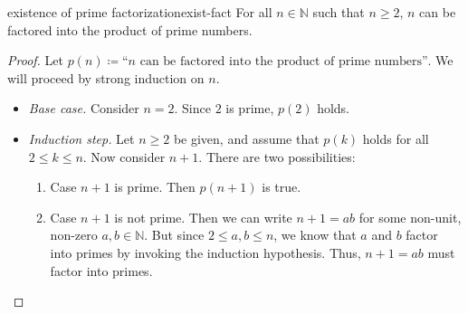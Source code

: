 \documentclass{article}
\theoremstyle{definition}
\begin{document}
\begin{theorem}{existence of prime factorization}{exist-fact}
  For all $n \in \mathbb{N}$ such that $n \ge 2$, $n$ can be factored into the
  product of prime numbers.
\end{theorem}
\begin{proof}
  Let $p(n) \coloneqq \textrm{``$n$ can be factored into the product of prime
  numbers''}$. We will proceed by strong induction on $n$.
  \begin{itemize}
    \item \textit{Base case.} Consider $n=2$. Since $2$ is prime, $p(2)$ holds.
    \item \textit{Induction step.} Let $n \ge 2$ be given, and assume that
      $p(k)$ holds for all $2 \le k \le n$. Now consider $n+1$. There are two
      possibilities:
      \begin{enumerate}
        \item Case $n+1$ is prime. Then $p(n+1)$ is true.
        \item Case $n+1$ is not prime. Then we can write $n+1 = ab$ for some
          non-unit, non-zero $a, b \in \mathbb{N}$. But since $2 \le a,b \le n$,
          we know that $a$ and $b$ factor into primes by invoking the induction
          hypothesis. Thus, $n+1 = ab$ must factor into primes.
      \end{enumerate}
  \end{itemize}
\end{proof}
\end{document}

